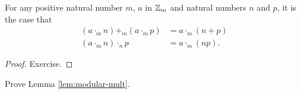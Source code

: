 \begin{lem}\label{lem:modular-mult}
	For any positive natural number $m$, $a$ in ${\mathbb Z}_m$ and natural numbers $n$ and $p$, it is the case that 
	\begin{align*} 
		(a \cdot_m n)+_m (a\cdot_m p) &= a\cdot_m (n+p)\\
		(a\cdot_m n)\cdot_n p &= a\cdot_m (np).
	\end{align*}

\begin{proof}
	Exercise.
\end{proof}
\end{lem}

\begin{exer}
	\begin{exercise}
		\item Prove Lemma \ref{lem:modular-mult}.
	\end{exercise}
\end{exer}




